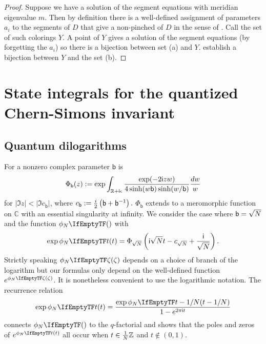 \documentclass[margincite, leqno]{sl2art}
\numberwithin{equation}{section}
\begin{document}
\begin{proof}
  Suppose we have a solution of the segment equations with meridian
  eigenvalue \(m\).
  Then by definition there is a well-defined assignment of parameters
  \(a_{i}\) to the segments of \(D\) that give a non-pinched
   of \(D\) in the sense of
  \cite{McphailSnyder2022hyperbolicstructureslinkcomplements}.
  Call the set of such colorings \(Y\).
  A point of \(Y\) gives a solution of the segment equations (by
  forgetting the \(a_{i}\)) so there is a bijection between set (a) and \(Y\).
  \cite[Theorem 2.11 and Theorem
  1]{McphailSnyder2024octahedralcoordinateswirtingerpresentation}
  establish a bijection between \(Y\) and the set (b).
\end{proof}

\section{State integrals for the quantized Chern-Simons invariant}
\label{sec:State integrals big}

\subsection{Quantum dilogarithms}%
\label{sec:Quantum dilogarithms}

For a nonzero complex parameter \(\mathsf b\)  \cite{Faddeev2001} is
\begin{equation}
  \Phi_{\mathsf b}(z) \mathrel{:=}
  \exp
  \int_{\mathbb{R} + \mathsf{i} \epsilon}
  \frac{
    \exp(-2 \mathsf{i} zw)
  }{
    4 \sinh(w \mathsf b ) \sinh(w/\mathsf b)
  }
  \frac{dw}{w}
\end{equation}
for \(|\Im z| < |\Im c_{\mathsf b}|\), where
\(
  c_{\mathsf b} \mathrel{:=} \frac{i}{2} \left( \mathsf b + \mathsf b^{-1}\right).
\)
\(\Phi_{\mathsf b}\) extends to a meromorphic function on
\(\mathbb{C}\) with an essential singularity at infinity.
We consider the case where \(\mathsf b = \sqrt {N}\) and the function
\(\pfl{}\) with
\begin{equation}
  \exp \pfl{t}
  =
  \Phi_{\sqrt \nr}\left(\ii \sqrt{\nr} t - c_{\sqrt \nr} +
  \frac{\ii}{\sqrt \nr} \right)
  .
\end{equation}
Strictly speaking \(\pfl{\zeta}\) depends on a choice of branch of
the logarithm but our formulas only depend on the well-defined
function \(e^{\pfl{\zeta}}\).
It is nonetheless convenient to use the logarithmic notation.
The recurrence relation
\begin{equation}
  \label{eq:pfl recurrence}
  \exp \pfl{t} =
  \frac{
    \exp \pfl{t-1/\nr}
  }{
    1 - e^{\tu t}
  }
\end{equation}
connects \(\pfl{}\) to the \(q\)-factorial and shows that the poles
and zeros of \(e^{\pfl{t}}\) all occur when \(t \in \frac{1}{N}
\mathbb{Z}\) and \(t \not \in (0,1)\).
\end{document}
